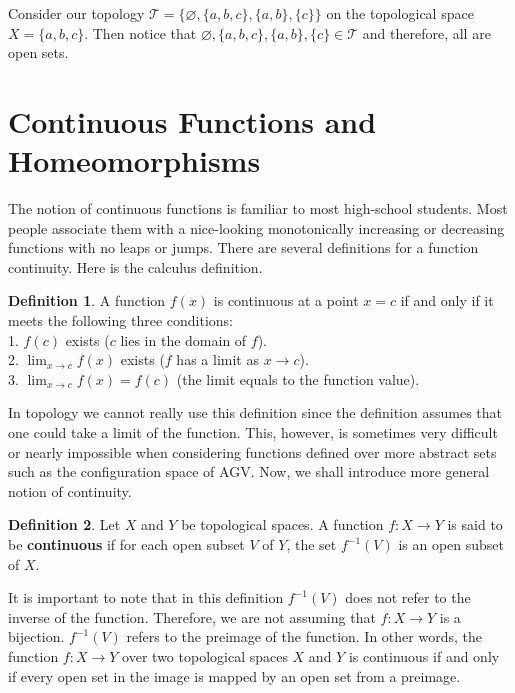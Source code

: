 \documentclass[a4paper, twocolumn]{article}
\newcommand{\topology}{\mathcal{T}}              %
\renewcommand{\emptyset}{\varnothing}            %
\newcommand{\rarr}{\rightarrow}                  %
\theoremstyle{definition}
\newtheorem*{definition}{Definition}
\begin{document}
Consider our topology $\topology = \{\emptyset, \{a, b, c\}, \{a, b\}, \{c\}\}$ on the topological space $X = \{a, b, c\}$.
Then notice that $\emptyset, \{a, b, c\}, \{a, b\}, \{c\} \in \topology$ and therefore, all are open sets.


\section*{\centering Continuous Functions and Homeomorphisms}
The notion of continuous functions is familiar to most high-school students.
Most people associate them with a nice-looking monotonically increasing or decreasing
functions with no leaps or jumps. There are several definitions for a function continuity.
Here is the calculus definition.

\begin{definition}
\cite{5} A function $f(x)$ is continuous at a point $x = c$ if and only if it meets the following
three conditions:\\
1. $f(c)$ exists ($c$ lies in the domain of $f$).\\
2. $\lim_{x \to c}f(x)$ exists ($f$ has a limit as $x \to c$).\\
3. $\lim_{x \to c}f(x) = f(c)$ (the limit equals to the function value).
\end{definition}

In topology we cannot really use this definition since the definition assumes
that one could take a limit of the function. This, however, is sometimes very difficult or nearly impossible
when considering functions defined over more abstract sets such as the configuration space
of AGV. Now, we shall introduce more general notion of continuity.

\begin{definition}
\cite{6} Let $X$ and $Y$ be topological spaces. A function $f : X \to Y$ is said to be \textbf{continuous} if
for each open subset $V$ of $Y$, the set $f^{-1}(V)$ is an open subset of $X$.
\end{definition}

It is important to note that in this definition $f^{-1}(V)$ does not refer to the inverse of the function.
Therefore, we are not assuming that $f : X \rarr Y$ is a bijection. $f^{-1}(V)$ refers to the preimage of the function.
In other words, the function $f : X \to Y$ over two topological spaces $X$ and $Y$ is continuous if and only if every open
set in the image is mapped by an open set from a preimage.
\end{document}
